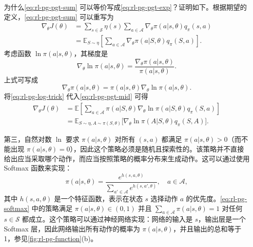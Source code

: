 为什么\cref{eq:rl-pg-pgt-sum} 可以等价写成\cref{eq:rl-pg-pgt-exp}？证明如下。根据期望的定义，\eqref{eq:rl-pg-pgt-sum} 可以重写为
\begin{equation}
\begin{aligned}
\nabla_{\theta} J(\theta) &= \sum_{s \in \mathcal{S}} \eta(s) \sum_{a \in \mathcal{A}} \nabla_{\theta} \pi(a|s,\theta) q_{\pi}(s,a) \\
&= \mathbb{E}_{S \sim \eta} \left[ \sum_{a \in \mathcal{A}} \nabla_{\theta} \pi(a|S,\theta) q_{\pi}(S,a) \right].
\end{aligned}
\label{eq:rl-pg-pgt-mid}
\end{equation}
考虑函数 $\ln \pi(a|s,\theta)$，其梯度是
\begin{equation}
\nabla_{\theta} \ln \pi(a|s,\theta) = \frac{\nabla_{\theta} \pi(a|s,\theta)}{\pi(a|s,\theta)}.
\end{equation}
上式可写成
\begin{equation}
\nabla_{\theta} \pi(a|s,\theta) = \pi(a|s,\theta) \nabla_{\theta} \ln \pi(a|s,\theta).
\label{eq:rl-pg-log-trick}
\end{equation}
将\cref{eq:rl-pg-log-trick} 代入\cref{eq:rl-pg-pgt-mid} 可得
\begin{equation}
\begin{aligned}
\nabla_{\theta} J(\theta) &= \mathbb{E}\left[ \sum_{a \in \mathcal{A}} \pi(a|S,\theta) \nabla_{\theta} \ln \pi(a|S,\theta) q_{\pi}(S,a) \right] \\
&= \mathbb{E}_{S \sim \eta, A \sim \pi(S,\theta)} \Big[ \nabla_{\theta} \ln \pi(A|S,\theta) q_{\pi}(S,A) \Big].
\end{aligned}
\end{equation}

第三，自然对数 $\ln$ 要求 $\pi(a|s,\theta)$ 对所有 $(s,a)$ 都满足 $\pi(a|s,\theta)>0$（而不能出现 $\pi(a|s,\theta)=0$），因此这个策略必须是随机且探索性的。该策略并不直接给出应当采取哪个动作，而应当按照策略的概率分布来生成动作。这可以通过使用 Softmax 函数来实现：
\begin{equation}
\pi(a|s,\theta) = \frac{e^{h(s,a,\theta)}}{\sum_{a' \in \mathcal{A}} e^{h(s,a',\theta)}}, \quad a \in \mathcal{A},
\label{eq:rl-pg-softmax}
\end{equation}
其中 $h(s,a,\theta)$ 是一个特征函数，表示在状态 $s$ 选择动作 $a$ 的优先度。\cref{eq:rl-pg-softmax} 中的策略满足 $\pi(a|s,\theta)\in (0,1)$ 并且 $\sum_{a\in \mathcal{A}}\pi(a|s,\theta) = 1$ 对任何 $s\in \mathcal{S}$ 都成立。这个策略可以通过神经网络实现：网络的输入是 $s$，输出层是一个 Softmax 层，因此网络输出所有动作的概率为 $\pi(a|s,\theta)$，并且输出的总和等于 1，参见\cref{fig:rl-pg-function}(b)。

